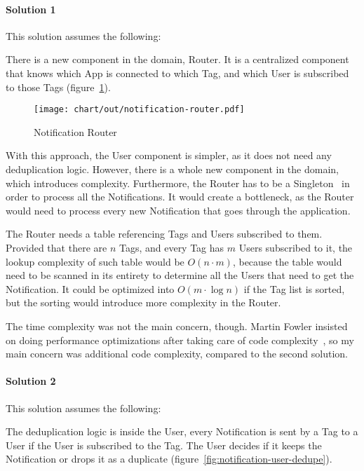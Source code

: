 \paragraph*{Solution 1}\label{par:duplication-solution-1}

This solution assumes the following:

There is a new component in the domain, Router.
It is a centralized component
that knows which App is connected to which Tag,
and which User is subscribed to those Tags
(figure~\ref{fig:notification-router}).

\begin{figure}[h]
  \centering
  \texttt{[image: chart/out/notification-router.pdf]}
  \caption{Notification Router}
  \label{fig:notification-router}
\end{figure}

With this approach,
the User component is simpler,
as it does not need any deduplication logic.
However, there is a whole new component
in the domain, which introduces complexity.
Furthermore, the Router has to be
a Singleton~\cite[pp.~127-134]{gamma_design_1994}
in order to process all the Notifications.
It would create a bottleneck,
as the Router would need to process every new Notification
that goes through the application.

The Router needs a table referencing
Tags and Users subscribed to them.
Provided that there are $n$ Tags,
and every Tag has $m$ Users subscribed to it,
the lookup complexity of such table
would be $O(n \cdot m)$,
because the table would need to be
scanned in its entirety to determine
all the Users that need to get the Notification.
It could be optimized into $O(m \cdot \log n)$
if the Tag list is sorted,
but the sorting would introduce
more complexity in the Router.

The time complexity was not the main concern, though.
Martin Fowler insisted on doing performance optimizations
after taking care of code complexity~\cite{fowler_refactoring_2019},
so my main concern was additional code complexity,
compared to the second solution.

\paragraph*{Solution 2}\label{par:duplication-solution-2}

This solution assumes the following:

The deduplication logic is inside the User,
every Notification is sent by a Tag to a User
if the User is subscribed to the Tag.
The User decides if it keeps the Notification
or drops it as a duplicate
(figure~\ref{fig:notification-user-dedupe}).

